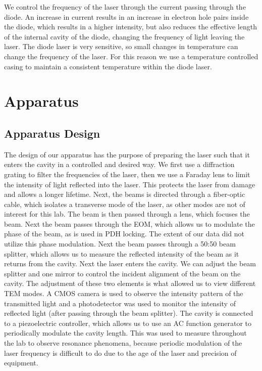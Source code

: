 \documentclass[twocolumn,amsmath,amssymb,pra]{revtex4-2}
\begin{document}
We control the frequency of the laser through the current passing through the diode. An increase in current results in an increase in electron hole pairs inside the diode, which results in a higher intensity, but also reduces the effective length of the internal cavity of the diode, changing the frequency of light leaving the laser. The diode laser is very sensitive, so small changes in temperature can change the frequency of the laser. For this reason we use a temperature controlled casing to maintain a consistent temperature within the diode laser.




\section{Apparatus}

\subsection{Apparatus Design}
The design of our apparatus has the purpose of preparing the laser such that it enters the cavity in a controlled and desired way. We first use a diffraction grating to filter the frequencies of the laser, then we use a Faraday lens to limit the intensity of light reflected into the laser. This protects the laser from damage and allows a longer lifetime. Next, the beams is directed through a fiber-optic cable, which isolates a  transverse mode of the laser, as other modes are not of interest for this lab. The beam is then passed through a lens, which focuses the beam. Next the beam passes through the EOM, which allows us to modulate the phase of the beam, as is used in PDH locking. The extent of our data did not utilize this phase modulation. Next the beam passes through a 50:50 beam splitter, which allows us to measure the reflected intensity of the beam as it returns from the cavity. Next the laser enters the cavity. We can adjust the beam splitter and one mirror to control the incident alignment of the beam on the cavity. The adjustment of these two elements is what allowed us to view different TEM modes. A CMOS camera is used to observe the intensity pattern of the transmitted light and a photodetector was used to monitor the intensity of reflected light (after passing through the beam splitter). The cavity is connected to a piezoelectric controller, which allows us to use an AC function generator to periodically modulate the cavity length. This was used to measure throughout the lab to observe resonance phenomena, because periodic modulation of the laser frequency is difficult to do due to the age of the laser and precision of equipment.
\end{document}
